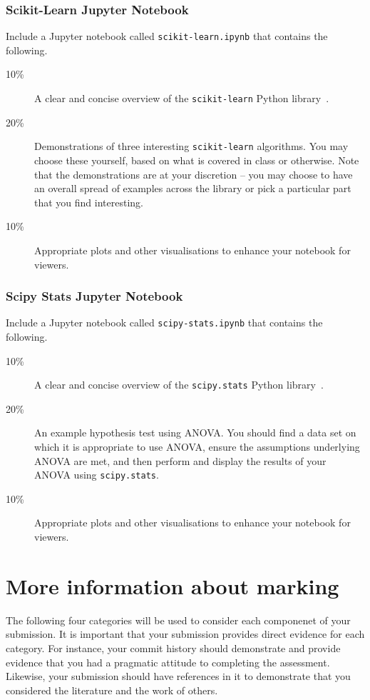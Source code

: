 \documentclass[a4paper, 12pt]{scrartcl}
\begin{document}
  \subsubsection*{Scikit-Learn Jupyter Notebook}
  Include a Jupyter notebook called \texttt{scikit-learn.ipynb} that contains the following.
  \begin{description}
    \item[10\%] A clear and concise overview of the \texttt{scikit-learn} Python library~\cite{scikit-learn}.
    \item[20\%] Demonstrations of three interesting \texttt{scikit-learn} algorithms. You may choose these yourself, based on what is covered in class or otherwise. Note that the demonstrations are at your discretion -- you may choose to have an overall spread of examples across the library or pick a particular part that you find interesting.
    \item[10\%] Appropriate plots and other visualisations to enhance your notebook for viewers.
  \end{description}
  
  \subsubsection*{Scipy Stats Jupyter Notebook}
  Include a Jupyter notebook called \texttt{scipy-stats.ipynb} that contains the following.
  \begin{description}
    \item[10\%] A clear and concise overview of the \texttt{scipy.stats} Python library~\cite{scipy-stats}.
    \item[20\%] An example hypothesis test using ANOVA. You should find a data set on which it is appropriate to use ANOVA, ensure the assumptions underlying ANOVA are met, and then perform and display the results of your ANOVA using \texttt{scipy.stats}.
    \item[10\%] Appropriate plots and other visualisations to enhance your notebook for viewers.
  \end{description}

  \section*{More information about marking}
    The following four categories will be used to consider each componenet of your submission.
    It is important that your submission provides direct evidence for each category.
    For instance, your commit history should demonstrate and provide evidence that you had a pragmatic attitude to completing the assessment.
    Likewise, your submission should have references in it to demonstrate that you considered the literature and the work of others.
  
\end{document}
